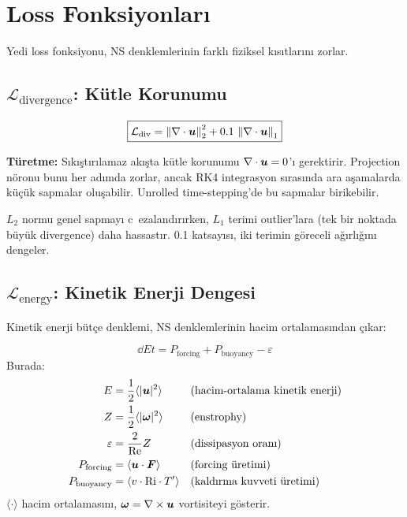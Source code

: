 \section{Loss Fonksiyonları}
\label{sec:loss_functions}

Yedi loss fonksiyonu, NS denklemlerinin farklı fiziksel kısıtlarını zorlar.


\subsection{$\mathcal{L}_{\text{divergence}}$: Kütle Korunumu}
\label{sec:loss_divergence}

\begin{equation}
    \boxed{
        \mathcal{L}_{\text{div}} = \left\|\nabla \cdot \bm{u}\right\|_2^2
        + 0.1 \, \left\|\nabla \cdot \bm{u}\right\|_1
    }
    \label{eq:loss_div}
\end{equation}

\textbf{Türetme:} Sıkıştırılamaz akışta kütle korunumu $\nabla \cdot \bm{u} = 0$'ı gerektirir. Projection nöronu bunu her adımda zorlar, ancak RK4 integrasyon sırasında ara aşamalarda küçük sapmalar oluşabilir. Unrolled time-stepping'de bu sapmalar birikebilir.

$L_2$ normu genel sapmayı c\ ezalandırırken, $L_1$ terimi outlier'lara (tek bir noktada büyük divergence) daha hassastır. 0.1 katsayısı, iki terimin göreceli ağırlığını dengeler.


\subsection{$\mathcal{L}_{\text{energy}}$: Kinetik Enerji Dengesi}
\label{sec:loss_energy}

Kinetik enerji bütçe denklemi, NS denklemlerinin hacim ortalamasından çıkar:

\begin{equation}
    \dd{E}{t} = P_{\text{forcing}} + P_{\text{buoyancy}} - \varepsilon
    \label{eq:energy_budget}
\end{equation}
Burada:
\begin{align}
    E &= \frac{1}{2}\langle |\bm{u}|^2 \rangle
    && \text{(hacim-ortalama kinetik enerji)} \label{eq:KE}\\
    Z &= \frac{1}{2}\langle |\bm{\omega}|^2 \rangle
    && \text{(enstrophy)} \label{eq:enstrophy}\\
    \varepsilon &= \frac{2}{\mathrm{Re}} Z
    && \text{(dissipasyon oranı)} \label{eq:dissipation}\\
    P_{\text{forcing}} &= \langle \bm{u} \cdot \bm{F} \rangle
    && \text{(forcing üretimi)} \label{eq:P_forcing}\\
    P_{\text{buoyancy}} &= \langle v \cdot \mathrm{Ri} \cdot T' \rangle
    && \text{(kaldırma kuvveti üretimi)} \label{eq:P_buoyancy}
\end{align}
$\langle \cdot \rangle$ hacim ortalamasını, $\bm{\omega} = \nabla \times \bm{u}$ vortisiteyi gösterir.

